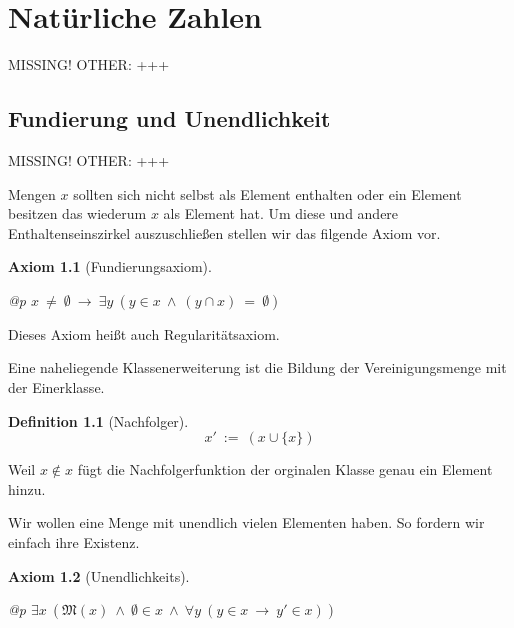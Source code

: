 \documentclass[a4paper,german,10pt,twoside]{book}
\newtheorem{ax}{Axiom}
\theoremstyle{definition}
\newtheorem{defn}[thm]{Definition}
\theoremstyle{remark}
\begin{document}

\chapter{Nat{\"u}rliche Zahlen} \label{chapter5} \hypertarget{chapter5}{}

MISSING! OTHER: +++

\section{Fundierung und Unendlichkeit} \label{chapter5_section0} \hypertarget{chapter5_section0}{}
MISSING! OTHER: +++

\par
Mengen $x$ sollten sich nicht selbst als Element enthalten oder ein Element besitzen das wiederum
$x$ als Element hat. Um diese und andere Enthaltenseinszirkel auszuschlie{\ss}en stellen wir das filgende
Axiom vor.

\begin{ax}[Fundierungsaxiom]
\label{axiom:foundation} \hypertarget{axiom:foundation}{}
\mbox{}
\begin{longtable}{{@{\extracolsep{\fill}}p{\linewidth}}}
\centering $x \ \neq \ \emptyset\ \rightarrow \ \exists y\ (y \in x\ \land \ (y \cap x) \ =  \ \emptyset)$
\end{longtable}

\end{ax}

Dieses Axiom hei{\ss}t auch Regularit{\"a}tsaxiom.


\par
Eine naheliegende Klassenerweiterung ist die Bildung der
Vereinigungsmenge mit der Einerklasse.

\begin{defn}[Nachfolger]
\label{definition:successor} \hypertarget{definition:successor}{}
$$x'\ := \ (x \cup \{ x \})$$

\end{defn}

Weil $x \notin x$ f{\"u}gt die Nachfolgerfunktion der orginalen Klasse
genau ein Element hinzu.


\par
Wir wollen eine Menge mit unendlich vielen Elementen haben. So fordern wir einfach ihre Existenz.

\begin{ax}[Unendlichkeits]
\label{axiom:infinity} \hypertarget{axiom:infinity}{}
\mbox{}
\begin{longtable}{{@{\extracolsep{\fill}}p{\linewidth}}}
\centering $\exists x\ (\mathfrak{M}(x)\ \land \ \emptyset \in x\ \land \ \forall y\ (y \in x\ \rightarrow \ y' \in x))$
\end{longtable}

\end{ax}
\end{document}
